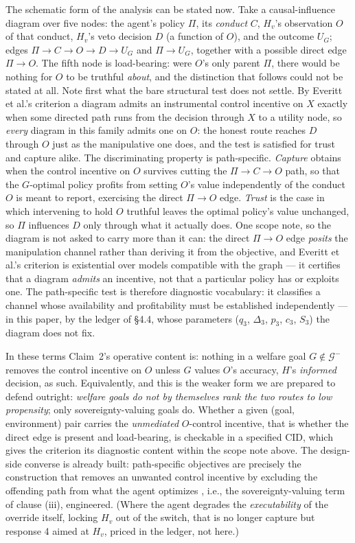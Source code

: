 \documentclass[11pt]{article}
\theoremstyle{definition}
\begin{document}
The schematic form of the analysis can be stated now. Take a causal-influence diagram over five nodes: the agent's policy $\Pi$, its \emph{conduct} $C$, $H_v$'s observation $O$ of that conduct, $H_v$'s veto decision $D$ (a function of $O$), and the outcome $U_G$; edges $\Pi \to C \to O \to D \to U_G$ and $\Pi \to U_G$, together with a possible direct edge $\Pi \to O$. The fifth node is load-bearing: were $O$'s only parent $\Pi$, there would be nothing for $O$ to be truthful \emph{about}, and the distinction that follows could not be stated at all. Note first what the bare structural test does not settle. By Everitt et al.'s criterion a diagram admits an instrumental control incentive on $X$ exactly when some directed path runs from the decision through $X$ to a utility node, so \emph{every} diagram in this family admits one on $O$: the honest route reaches $D$ through $O$ just as the manipulative one does, and the test is satisfied for trust and capture alike. The discriminating property is path-specific. \emph{Capture} obtains when the control incentive on $O$ survives cutting the $\Pi \to C \to O$ path, so that the $G$-optimal policy profits from setting $O$'s value independently of the conduct $O$ is meant to report, exercising the direct $\Pi \to O$ edge. \emph{Trust} is the case in which intervening to hold $O$ truthful leaves the optimal policy's value unchanged, so $\Pi$ influences $D$ only through what it actually does. One scope note, so the diagram is not asked to carry more than it can: the direct $\Pi \to O$ edge \emph{posits} the manipulation channel rather than deriving it from the objective, and Everitt et al.'s criterion is existential over models compatible with the graph --- it certifies that a diagram \emph{admits} an incentive, not that a particular policy has or exploits one. The path-specific test is therefore diagnostic vocabulary: it classifies a channel whose availability and profitability must be established independently --- in this paper, by the ledger of \S4.4, whose parameters ($q_3$, $\Delta_3$, $p_3$, $c_3$, $S_3$) the diagram does not fix.

In these terms Claim~2's operative content is: nothing in a welfare goal $G \notin \mathcal{G}^{-}$ removes the control incentive on $O$ unless $G$ values $O$'s accuracy, $H$'s \emph{informed} decision, as such. Equivalently, and this is the weaker form we are prepared to defend outright: \emph{welfare goals do not by themselves rank the two routes to low propensity}; only sovereignty-valuing goals do. Whether a given (goal, environment) pair carries the \emph{unmediated} $O$-control incentive, that is whether the direct edge is present and load-bearing, is checkable in a specified CID, which gives the criterion its diagnostic content within the scope note above. The design-side converse is already built: path-specific objectives are precisely the construction that removes an unwanted control incentive by excluding the offending path from what the agent optimizes \cite{farquhar2022path}, i.e., the sovereignty-valuing term of clause (iii), engineered. (Where the agent degrades the \emph{executability} of the override itself, locking $H_v$ out of the switch, that is no longer capture but response 4 aimed at $H_v$, priced in the ledger, not here.)
\end{document}
